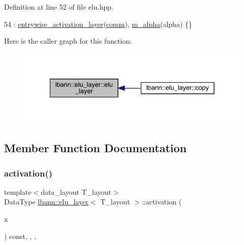 Definition at line 52 of file elu.\+hpp.


\begin{DoxyCode}
54     : \hyperlink{classlbann_1_1entrywise__activation__layer_aada1d9200612dcd13259799ef327c557}{entrywise\_activation\_layer}(\hyperlink{file__io_8cpp_ab048c6f9fcbcfaa57ce68b00263dbebe}{comm}), \hyperlink{classlbann_1_1elu__layer_aaeb8ac055d22365a6f387c01f11db93d}{m\_alpha}(alpha) \{\}
\end{DoxyCode}
Here is the caller graph for this function\+:\nopagebreak
\begin{figure}[H]
\begin{center}
\leavevmode
\includegraphics[width=335pt]{classlbann_1_1elu__layer_a37a371015add326278f7a537ade73e30_icgraph}
\end{center}
\end{figure}


\subsection{Member Function Documentation}
\mbox{\label{classlbann_1_1elu__layer_a36412ea7156d5c433e31681e70222ad6}} 
\subsubsection{\texorpdfstring{activation()}{activation()}}
{\footnotesize\ttfamily template$<$data\+\_\+layout T\+\_\+layout$>$ \\
Data\+Type \hyperlink{classlbann_1_1elu__layer}{lbann\+::elu\+\_\+layer}$<$ T\+\_\+layout $>$\+::activation (\begin{DoxyParamCaption}\item[{Data\+Type}]{x }\end{DoxyParamCaption}) const\hspace{0.3cm}{\ttfamily [inline]}, {\ttfamily [override]}, {\ttfamily [protected]}, {\ttfamily [virtual]}}

